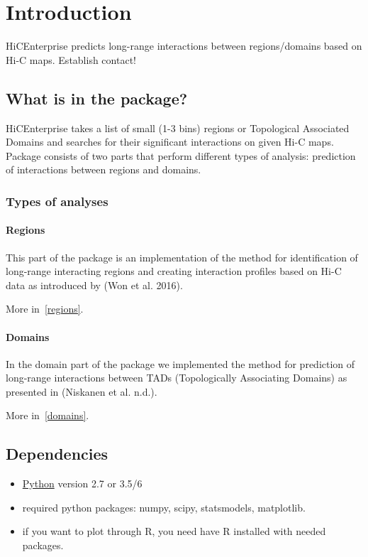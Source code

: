 \chapter{Introduction}
\label{intro}

HiCEnterprise predicts long-range interactions between regions/domains based on Hi-C maps.
Establish contact!

\section{What is in the package?}
HiCEnterprise takes a list of small (1-3 bins) regions or Topological Associated Domains and searches for their significant interactions on given Hi-C maps.
Package consists of two parts that perform different types of analysis: prediction of interactions between regions and domains.

\subsection{Types of analyses}

\subsubsection{Regions}
This part of the package is an implementation of the method for identification of long-range interacting regions and
creating interaction profiles based on Hi-C data as introduced by (Won et al. 2016).

More in~\ref{regions}.

\subsubsection{Domains}
In the domain part of the package we implemented the method for prediction of long-range interactions between TADs
(Topologically Associating Domains) as presented in (Niskanen et al. n.d.).

More in~\ref{domains}.

\section{Dependencies}
\begin{itemize}
\item \href{https://www.python.org}{Python} version 2.7 or 3.5/6
\item required python packages: numpy, scipy, statsmodels, matplotlib.
\item if you want to plot through R, you need have R installed with needed packages.

\end{itemize}

